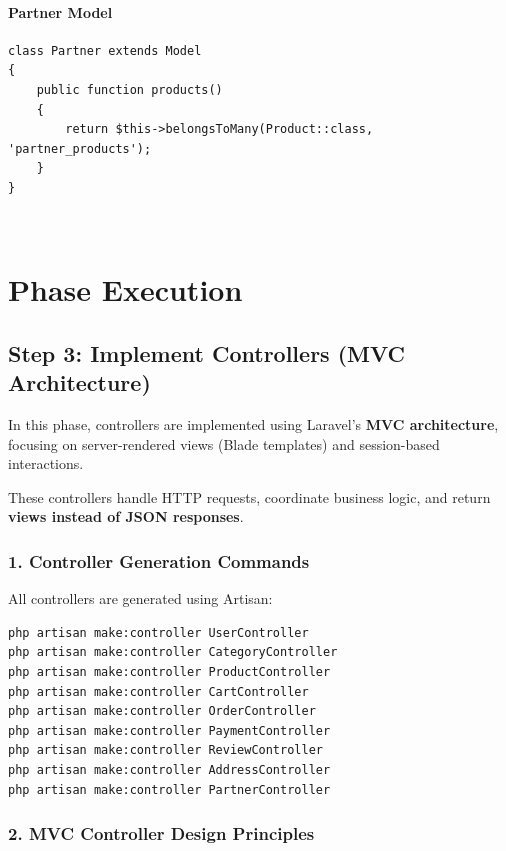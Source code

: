 \documentclass[12pt,a4paper]{article}
\begin{document}
\paragraph{Partner Model}
\begin{verbatim}
class Partner extends Model
{
    public function products()
    {
        return $this->belongsToMany(Product::class, 'partner_products');
    }
}
\end{verbatim}\
\section{Phase Execution}

\subsection{Step 3: Implement Controllers (MVC Architecture)}

In this phase, controllers are implemented using Laravel's \textbf{MVC architecture}, focusing on server-rendered views (Blade templates) and session-based interactions.

These controllers handle HTTP requests, coordinate business logic, and return \textbf{views instead of JSON responses}.

\subsubsection{1. Controller Generation Commands}

All controllers are generated using Artisan:

\begin{verbatim}
php artisan make:controller UserController
php artisan make:controller CategoryController
php artisan make:controller ProductController
php artisan make:controller CartController
php artisan make:controller OrderController
php artisan make:controller PaymentController
php artisan make:controller ReviewController
php artisan make:controller AddressController
php artisan make:controller PartnerController
\end{verbatim}

\subsubsection{2. MVC Controller Design Principles}
\end{document}
